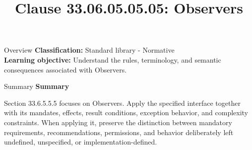 \documentclass[10pt,letterpaper]{article}
\title{Clause 33.06.05.05.05: Observers}
\author{}
\date{}
\begin{document}
\maketitle
\begin{CornellOverviewBox}{Overview}
\textbf{Classification:} Standard library - Normative\\[2pt]
\textbf{Learning objective:} Understand the rules, terminology, and semantic consequences associated with Observers.
\end{CornellOverviewBox}\begin{CornellSummaryBox}{Summary}
{\sffamily\bfseries\color{Accent} Summary}\par\vspace{3pt}Section 33.6.5.5.5 focuses on Observers. Apply the specified interface together with its mandates, effects, result conditions, exception behavior, and complexity constraints. When applying it, preserve the distinction between mandatory requirements, recommendations, permissions, and behavior deliberately left undefined, unspecified, or implementation-defined.
\end{CornellSummaryBox}
\end{document}
